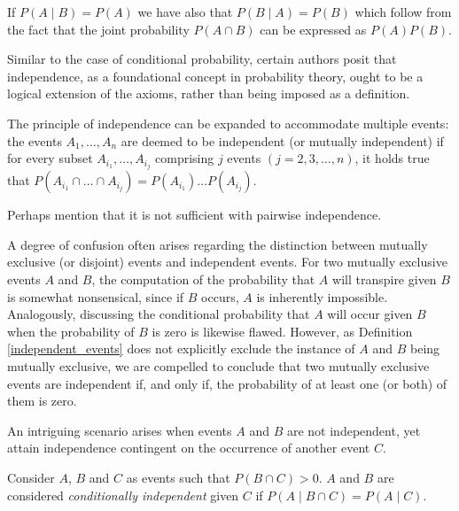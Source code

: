If $P \left( A \mid B\right) = P \left( A \right)$ we have also that $P \left( B \mid  A \right) = P \left( B \right)$ which follow from the fact that the joint probability $P \left( A \cap B \right)$ can be expressed as $P \left( A \right) P \left(B \right)$.

Similar to the case of conditional probability, certain authors posit that independence, as a foundational concept in probability theory, ought to be a logical extension of the axioms, rather than being imposed as a definition.

The principle of independence can be expanded to accommodate multiple events: the events $A_{1}, \ldots, A_{n}$ are deemed to be independent (or mutually independent) if for every subset $A_{i_1}, \ldots, A_{i_j}$ comprising $j$ events $\left( j = 2, 3, \ldots, n \right)$, it holds true that $P \left( A_{i_1} \cap \ldots \cap A_{i_j} \right) = P \left( A_{i_1} \right) \ldots P \left( A_{i_j}\right)$.

{\color{red} Perhaps mention that it is not sufficient with pairwise independence.}

\begin{example}
A degree of confusion often arises regarding the distinction between mutually exclusive (or disjoint) events and independent events. For two mutually exclusive events $A$ and $B$, the computation of the probability that $A$ will transpire given $B$ is somewhat nonsensical, since if $B$ occurs, $A$ is inherently impossible. Analogously, discussing the conditional probability that $A$ will occur given $B$ when the probability of $B$ is zero is likewise flawed. However, as Definition \ref{independent_events} does not explicitly exclude the instance of $A$ and $B$ being mutually exclusive, we are compelled to conclude that two mutually exclusive events are independent if, and only if, the probability of at least one (or both) of them is zero.
\end{example}

An intriguing scenario arises when events $A$ and $B$ are not independent, yet attain independence contingent on the occurrence of another event $C$.

\begin{definition}
Consider $A$, $B$ and $C$ as events such that $P\left( B \cap C \right)>0$. $A$ and $B$ are considered \emph{conditionally independent} given $C$ if $P\left(A \mid B \cap C \right) = P\left( A \mid C \right)$.
\end{definition}

